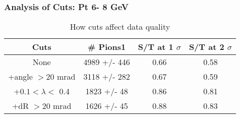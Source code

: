 \frame
{
\frametitle{Analysis of Cuts: Pt  6- 8 GeV}
\begin{table}
\caption{How cuts affect data quality}
\centering
\begin{tabular}{c c c c}
\hline\hline
Cuts & \# Pions1 & S/T at 1 $\sigma$ & S/T at 2 $\sigma$ \\ [0.5ex]
\hline
None & 4989 +/-  446 & 0.66 & 0.58 \\ %
+angle $> 20$ mrad & 3118 +/-  282 & 0.67 & 0.59 \\ %
+$0.1 < \lambda <$ 0.4 & 1823 +/-   48 & 0.86 & 0.81 \\ %
+dR $> 20$ mrad & 1626 +/-   45 & 0.88 & 0.83 \\ %
[1ex]
\hline
\end{tabular}
\label{table:nonlin}
\end{table}
}
